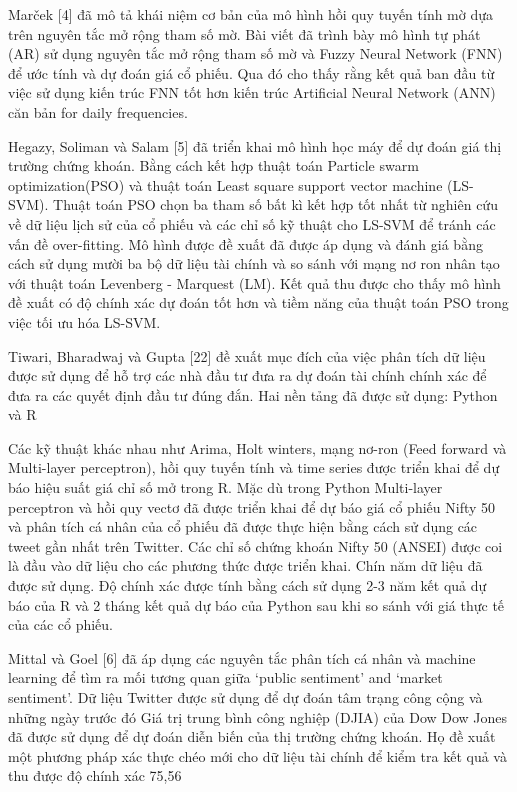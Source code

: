 Marček [4] đã mô tả khái niệm cơ bản của mô hình hồi quy tuyến tính mờ dựa trên nguyên tắc mở rộng tham số mờ. Bài viết đã trình bày mô hình tự phát (AR) sử dụng nguyên tắc mở rộng tham số mờ và Fuzzy Neural Network (FNN) để ước tính và dự đoán giá cổ phiếu. Qua đó cho thấy rằng kết quả ban đầu từ việc sử dụng kiến trúc FNN tốt hơn kiến trúc Artificial Neural Network (ANN) căn bản for daily frequencies.

Hegazy, Soliman và Salam [5] đã triển khai mô hình học máy để dự đoán giá thị trường chứng khoán. Bằng cách kết hợp thuật toán Particle swarm optimization(PSO) và thuật toán Least square support vector machine (LS-SVM). Thuật toán PSO chọn ba tham số bất kì kết hợp tốt nhất từ nghiên cứu về dữ liệu lịch sử của cổ phiếu và các chỉ số kỹ thuật cho LS-SVM để tránh các vấn đề over-fitting. Mô hình được đề xuất đã được áp dụng và đánh giá bằng cách sử dụng mười ba bộ dữ liệu tài chính và so sánh với mạng nơ ron nhân tạo với thuật toán Levenberg - Marquest (LM). Kết quả thu được cho thấy mô hình đề xuất có độ chính xác dự đoán tốt hơn và tiềm năng của thuật toán PSO trong việc tối ưu hóa LS-SVM.

Tiwari, Bharadwaj và Gupta [22] đề xuất mục đích của việc phân tích dữ liệu được sử dụng để hỗ trợ các nhà đầu tư đưa ra dự đoán tài chính chính xác để đưa ra các quyết định đầu tư đúng đắn. Hai nền tảng đã được sử dụng: Python và R

Các kỹ thuật khác nhau như Arima, Holt winters, mạng nơ-ron (Feed forward và Multi-layer perceptron), hồi quy tuyến tính và time series được triển khai để dự báo hiệu suất giá chỉ số mở trong R. Mặc dù trong Python Multi-layer perceptron và hồi quy vectơ đã được triển khai để dự báo giá cổ phiếu Nifty 50 và phân tích cá nhân của cổ phiếu đã được thực hiện bằng cách sử dụng các tweet gần nhất trên Twitter. Các chỉ số chứng khoán Nifty 50 (ANSEI) được coi là đầu vào dữ liệu cho các phương thức được triển khai. Chín năm dữ liệu đã được sử dụng. Độ chính xác được tính bằng cách sử dụng 2-3 năm kết quả dự báo của R và 2 tháng kết quả dự báo của Python sau khi so sánh với giá thực tế của các cổ phiếu.

Mittal và Goel [6] đã áp dụng các nguyên tắc phân tích cá nhân và machine learning để tìm ra mối tương quan giữa ‘public sentiment’ and ‘market sentiment’. Dữ liệu Twitter được sử dụng để dự đoán tâm trạng công cộng và những ngày trước đó Giá trị trung bình công nghiệp (DJIA) của Dow Dow Jones đã được sử dụng để dự đoán diễn biến của thị trường chứng khoán. Họ đề xuất một phương pháp xác thực chéo mới cho dữ liệu tài chính để kiểm tra kết quả và thu được độ chính xác 75,56%

